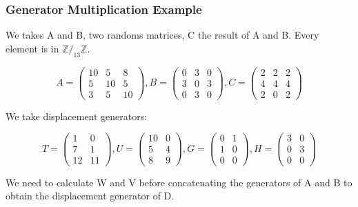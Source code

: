 \subsubsection{Generator Multiplication Example}
We takes A and B, two randoms matrices, C the result of A and B.
Every element is in $\mathbb{Z}/_{13}\mathbb{Z}$.

\begin{equation}
  A =
  \begin{pmatrix}
    10    & 5     & 8 \\
    5     & 10     & 5 \\
    3     & 5     & 10
  \end{pmatrix},
  B =
  \begin{pmatrix}
    0     & 3     & 0 \\
    3    & 0     & 3 \\
    0     &3     & 0
  \end{pmatrix},
  C =
  \begin{pmatrix}
    2     & 2     & 2 \\
    4     & 4     & 4 \\
    2     & 0     & 2
  \end{pmatrix}
\end{equation}

We take displacement generators:

\begin{equation}
  T =
  \begin{pmatrix}
    1    & 0     \\
    7     & 1    \\
    12     & 11
  \end{pmatrix},
  U =
  \begin{pmatrix}
    10     & 0      \\
    5     & 4      \\
    8     & 9
  \end{pmatrix},
  G =
  \begin{pmatrix}
    0    & 1      \\
    1     & 0      \\
    0     & 0
  \end{pmatrix},
  H =
  \begin{pmatrix}
    3     & 0      \\
    0     & 3      \\
    0     & 0
  \end{pmatrix}
\end{equation}

We need to calculate W and V before concatenating the generators of A
and B to obtain the displacement generator of D.

